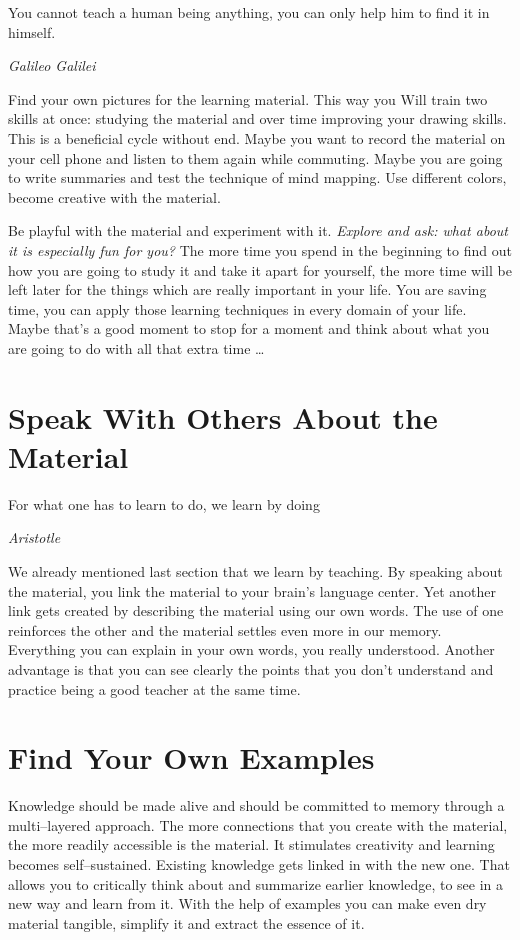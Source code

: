 \documentclass[../main.tex]{subfiles}
\begin{document}
\epigraph{You cannot teach a human being anything, you can only help him to find it in himself.}{\textit{Galileo Galilei}}

Find your own pictures for the learning material.
This way you Will train two skills at once: studying the material and over time improving your drawing skills. This is a beneficial cycle without end. Maybe you want to record the material on your cell phone and listen to them again while commuting. Maybe you are going to write summaries and test the technique of mind mapping. Use different colors, become creative with the material.



Be {playful} with the material and experiment with it.
\emph{Explore and ask: what about it is especially fun for you?}
The more time you spend in the beginning to find out how you are going to study it and take it apart for yourself, the more time will be left later for the things which are really important in your life.
You are saving time, you can apply those learning techniques in every domain of your life. Maybe that's a good moment to stop for a moment and think about what you are going to do with all that extra time \ldots

\section{Speak With Others About the Material}

\epigraph{For what one has to learn to do, we learn by doing}{\textit{Aristotle}}

We already mentioned last section that we learn by teaching.
By speaking about the material, you link the material to your brain's language center. Yet another link gets created by describing the material using our own words. 
The use of one reinforces the other and the material settles even more in our memory.
Everything you can explain in your own words, you really understood.
Another advantage is that you can see clearly the points that you don't understand and practice being a good teacher at the same time.

\section{Find Your Own Examples}

Knowledge should be made {alive} and should be committed to memory through a {multi--layered} approach. {The more connections that you create with the material, the more readily accessible is the material.}
{It stimulates {creativity} and learning becomes {self--sustained}. 
  Existing knowledge gets linked in with the new one.
  That allows you to critically think about and summarize earlier knowledge, to see in a new way and learn from it.}
With the help of examples you can make even dry material {tangible}, simplify it and extract the {essence} of it. 
\end{document}
